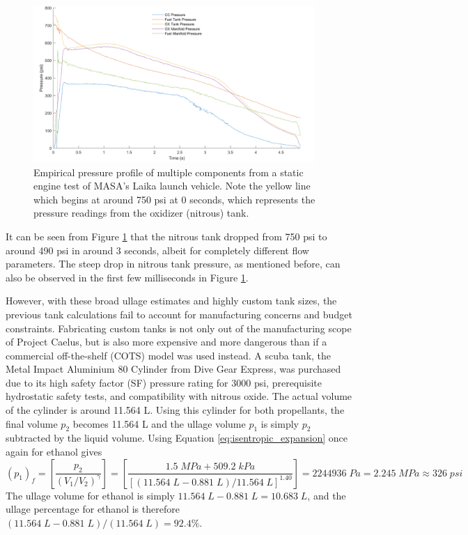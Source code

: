 \documentclass[9pt]{article} %
\numberwithin{equation}{section} %
\begin{document}
\begin{figure}[!htb]
\centering
\includegraphics[scale=0.55, width=0.95\textwidth]{masa_pressure_profile.png}
\caption{Empirical pressure profile of multiple components from a static engine test of MASA's Laika launch vehicle. Note the yellow line which begins at around 750 psi at 0 seconds, which represents the pressure readings from the oxidizer (nitrous) tank.}
\label{fig:masa_pressure_profile}
\end{figure}

It can be seen from Figure \ref{fig:masa_pressure_profile} that the nitrous tank dropped from 750 psi to around 490 psi in around 3 seconds, albeit for completely different flow parameters. The steep drop in nitrous tank pressure, as mentioned before, can also be observed in the first few milliseconds in Figure \ref{fig:masa_pressure_profile}.

However, with these broad ullage estimates and highly custom tank sizes, the previous tank calculations fail to account for manufacturing concerns and budget constraints. Fabricating custom tanks is not only out of the manufacturing scope of Project Caelus, but is also more expensive and more dangerous than if a commercial off-the-shelf (COTS) model was used instead. A scuba tank, the Metal Impact Aluminium 80 Cylinder from Dive Gear Express, was purchased due to its high safety factor (SF) pressure rating for 3000 psi, prerequisite hydrostatic safety tests, and compatibility with nitrous oxide. The actual volume of the cylinder is around 11.564 L. Using this cylinder for both propellants, the final volume $p_{2}$ becomes 11.564 L and the ullage volume $p_{1}$ is simply $p_{2}$ subtracted by the liquid volume. Using Equation \ref{eq:isentropic_expansion} once again for ethanol gives
\begin{equation*}
(p_{1})_{f} = \left[ \frac{p_{2}}{(V_{1}/V_{2})^{\gamma}} \right] = \left[ \frac{1.5 \; MPa + 509.2 \; kPa}{[(11.564 \; L - 0.881 \; L)/11.564 \; L]^{1.40}} \right] = 2244936 \; Pa = 2.245 \; MPa \approx 326 \; psi
\end{equation*}
The ullage volume for ethanol is simply $11.564 \; L - 0.881 \; L = 10.683 \; L$, and the ullage percentage for ethanol is therefore $(11.564 \; L - 0.881 \; L)/(11.564 \; L) =  92.4 \%$.
\end{document}
